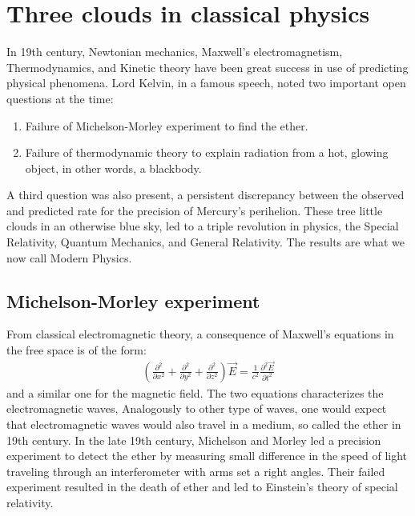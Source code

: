 \documentclass[11pt]{article}
\theoremstyle{break}
\theoremstyle{break}
\begin{document}
\newpage 
\tableofcontents
{}

\newpage
\setcounter{page}{1}
\vspace*{\fill}

\newpage
\section{Three clouds in classical physics}
In 19th century, Newtonian mechanics, Maxwell's electromagnetism, Thermodynamics, and Kinetic theory have been great success in use of predicting physical phenomena. Lord Kelvin, in a famous speech, noted two important open questions at the time:
\begin{enumerate}
\item Failure of Michelson-Morley experiment to find the ether.
\item Failure of thermodynamic theory to explain radiation from a hot, glowing object, in other words, a blackbody.
\end{enumerate}
A third question was also present, a persistent discrepancy between the observed and predicted rate for the precision of Mercury's perihelion. These tree little clouds in an otherwise blue sky, led to a triple revolution in physics, the Special Relativity, Quantum Mechanics, and General Relativity. The results are what we now call Modern Physics. \\

\subsection{Michelson-Morley experiment}
From classical electromagnetic theory, a consequence of Maxwell's equations in the free space is of the form:
\begin{align*}
\left(\frac{\partial^2}{\partial x^2}+ \frac{\partial^2}{\partial y^2}+ \frac{\partial^2}{\partial z^2} \right) \vec{E} = \frac{1}{c^2} \frac{\partial^2\vec{E}}{\partial t^2}
\end{align*}
and a similar one for the magnetic field. The two equations characterizes the electromagnetic waves, Analogously to other type of waves, one would expect that electromagnetic waves would also travel in a medium, so called the ether in 19th century. In the late 19th century, Michelson and Morley led a precision experiment to detect the ether by measuring small difference in the speed of light traveling through an interferometer with arms set a right angles. Their failed experiment resulted in the death of ether and led to Einstein's theory of special relativity. \\
\end{document}
